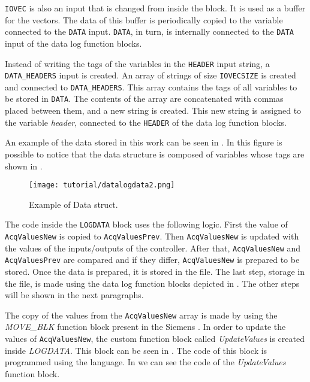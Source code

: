 \verb|IOVEC| is also an input that is changed from inside the block. It
is used as a buffer for the vectors. The data of this buffer is periodically copied to the variable connected to the
\verb|DATA| input. \verb|DATA|, in turn, is internally connected to the
\verb|DATA| input of the data log function blocks. 

Instead of writing the tags of the variables in the \verb|HEADER| input string, a \verb|DATA_HEADERS| input is created.
An array of strings of size \verb|IOVECSIZE| is created and connected to \verb|DATA_HEADERS|. This array contains the tags of all variables to be
stored in \verb|DATA|. The contents of the array are concatenated with
commas placed between them, and a new string is created. This new string is assigned to the variable
\emph{header}, connected to the \verb|HEADER| of the data log function blocks. 

An example of the data stored in this work can be seen in
. In this figure is possible to notice that the data structure is composed of variables whose tags are shown
in . 
\begin{figure}[H] \centering
 \texttt{[image: tutorial/datalogdata2.png]}
  \caption{Example of Data struct.}
  \label{fig:exampleDataStruct}
\end{figure}
The code inside the \verb|LOGDATA| block uses the following logic.
First the value of \verb|AcqValuesNew| is copied to \verb|AcqValuesPrev|. Then \verb|AcqValuesNew| is updated with the values of the inputs\slash outputs of the controller. After that, \verb|AcqValuesNew| and \verb|AcqValuesPrev| are compared and if they differ, \verb|AcqValuesNew| is prepared to be stored.
Once the data is prepared, it is stored in the file. 
The last step, storage in the file, is made using the data log function blocks depicted in
. The other steps will be shown
in the next paragraphs.

The copy of the values from the \verb|AcqValuesNew| array is made by using the \mbox{\emph{MOVE\_BLK}} function block present in the Siemens \PLC. 
In order to update the values of \verb|AcqValuesNew|, the custom function block called
\emph{UpdateValues} is created inside \emph{LOGDATA}. This block can be seen in
. The code of this block is programmed using the \SCL{} language. In  we
can see the code of the \mbox{\emph{UpdateValues}} function block.

